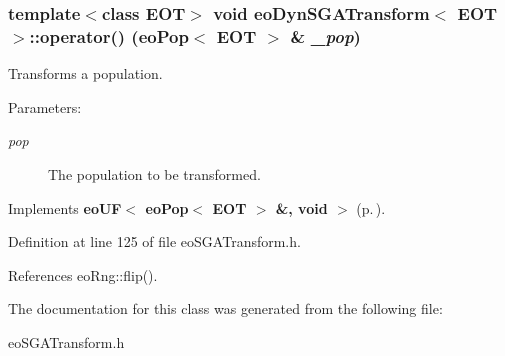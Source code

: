 \subsubsection{\setlength{\rightskip}{0pt plus 5cm}template$<$class EOT$>$ void {\bf eo\-Dyn\-SGATransform}$<$ {\bf EOT} $>$::operator() ({\bf eo\-Pop}$<$ {\bf EOT} $>$ \& {\em \_\-pop})\hspace{0.3cm}{\tt  [inline, virtual]}}\label{classeo_dyn_s_g_a_transform_a2}


Transforms a population. 

\begin{Desc}
\item[Parameters:]
\begin{description}
\item[{\em pop}]The population to be transformed. \end{description}
\end{Desc}


Implements {\bf eo\-UF$<$ eo\-Pop$<$ EOT $>$ \&, void $>$} {\rm (p.\,\pageref{classeo_u_f_a1})}.

Definition at line 125 of file eo\-SGATransform.h.

References eo\-Rng::flip().

The documentation for this class was generated from the following file:\begin{CompactItemize}
\item 
eo\-SGATransform.h\end{CompactItemize}
